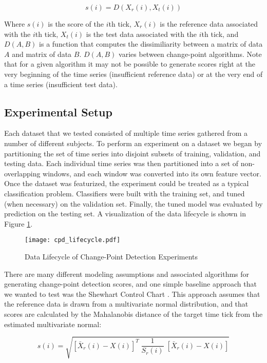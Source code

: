 \[
s(i) = D(X_r(i), X_t(i))
\]

Where $s(i)$ is the score of the $i$th tick, $X_r(i)$ is the reference
data associated with the $i$th tick, $X_t(i)$ is the test data
associated with the $i$th tick, and $D(A,B)$ is a function that computes the
dissimiliarity between a matrix of data $A$ and matrix of data $B$. $D(A,B)$
varies between change-point algorithms. Note that for a given
algorithm it may not be possible to generate scores right at the very beginning
of the time series (insufficient reference data) or at the very end of a time
series (insufficient test data).

\subsection{Experimental Setup}

Each dataset that we tested consisted of multiple time series gathered from
a number of different subjects. To perform an experiment on a dataset we
began by partitioning the set of time series into disjoint subsets of training,
validation, and testing data. Each individual time series was then partitioned
into a set of non-overlapping windows, and each window was converted into its
own feature vector. Once the dataset was featurized, the experiment could be
treated as a typical classification problem. Classifiers were built with the
training set, and tuned (when necessary) on the validation set. 
Finally, the tuned model was evaluated by prediction on the testing set.
A visualization of the data lifecycle is shown in Figure
\ref{fig:cpd_lifecycle}.
 
\begin{figure}
 \centering
 \texttt{[image: cpd\_lifecycle.pdf]}
 \caption{Data Lifecycle of Change-Point Detection Experiments}
 \label{fig:cpd_lifecycle}
\end{figure}

There are many different modeling assumptions and associated algorithms
for generating change-point detection scores, and one simple baseline approach
that we wanted to test was the Shewhart Control Chart \cite{shewhart26}.
This approach assumes that the reference data is drawn from a multivariate
normal distribution, and that scores are calculated by the Mahalanobis distance
of the target time tick from the estimated multivariate normal:

\[
s(i) = \sqrt{[\bar{X}_r(i) - X(i)]^T \; \frac{1}{S_r(i)} \; [\bar{X}_r(i) - X(i)]}
\]

